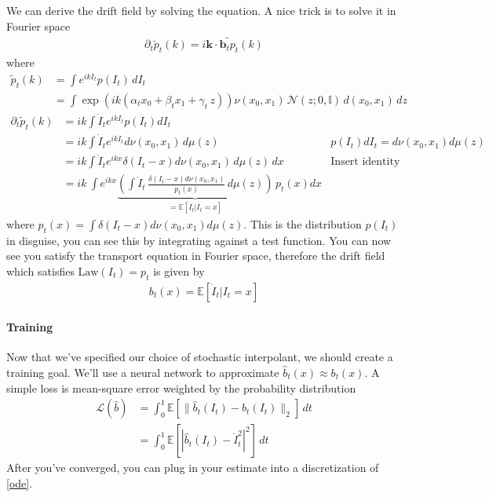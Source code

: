 We can derive the drift field by solving the equation. A nice trick is to solve it in Fourier space
\begin{align}
	\partial_t \tilde p_t(k) =  i \mathbf k \cdot \widetilde{\mathbf{b}_t p_t}(k)
\end{align}
where
\begin{align}
	\tilde p_t(k) & = \int e^{i k I_t} p(I_t)\, dI_t\\
	& = \int \exp\left( ik (\alpha_t x_0  + \beta_t x_1 + \gamma_t \, z)\right) \nu(x_0, x_1) \, \mathcal N(z; 0, \mathbb I) \, d(x_0, x_1) \, dz
\end{align}
\begin{align}
	\partial_t \tilde p_t(k) & = ik \int \dot I_t e^{ik I_t} p(I_t) dI_t\\	
	& = ik \int \dot I_t e^{ik I_t} d\nu(x_0, x_1) \, d\mu(z) & p(I_t) dI_t = d\nu(x_0, x_1) d\mu(z)\\
	& = ik \int  \dot I_t e^{ik x} \delta(I_t - x) d\nu(x_0, x_1) \, d\mu(z) \, dx & \text{Insert identity}\\
	& = ik \ \int e^{ikx} \underbrace{\left(\int \dot I_t \, \frac{\delta(I_t - x) d\nu(x_0, x_1)}{p_t(x)} \, d\mu(z)\right)}_{= \mathbb E[\dot I_t | I_t = x]} \, p_t(x) dx
\end{align}
where $p_t(x) = \int \delta(I_t - x) d\nu(x_0, x_1) d\mu(z)$. This is the distribution $p(I_t)$ in disguise, you can see this by integrating against a test function. You can now see you satisfy the transport equation in Fourier space, therefore the drift field which satisfies $\text{Law}(I_t) = p_t$ is given by
\begin{align}
	\boxed{b_t(x) = \mathbb E[\dot I_t | I_t = x]}
\end{align}

\paragraph{Training}
Now that we've specified our choice of stochastic interpolant, we should create a training goal. We'll use a neural network to approximate $\hat b_t(x) \approx b_t(x)$. A simple loss is mean-square error weighted by the probability distribution
\begin{align}
	\mathcal L(\hat b) & = \int_0^1 \mathbb E[\| \hat b_t(I_t) - b_t(I_t) \|_2]  \, dt\\
	& = \int_0^1 \mathbb E[|\hat b_t(I_t) - \dot I_t^2|^2] \, dt
\end{align}
After you've converged, you can plug in your estimate into a discretization of \ref{ode}.

